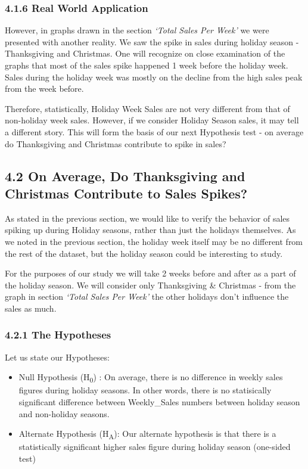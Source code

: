 \documentclass[]{article}
\begin{document}
\subsubsection{4.1.6 Real World
Application}\label{real-world-application}

However, in graphs drawn in the section \emph{`Total Sales Per Week'} we
were presented with another reality. We saw the spike in sales during
holiday season - Thanksgiving and Christmas. One will recognize on close
examination of the graphs that most of the sales spike happened 1 week
before the holiday week. Sales during the holiday week was mostly on the
decline from the high sales peak from the week before.

Therefore, statistically, Holiday Week Sales are not very different from
that of non-holiday week sales. However, if we consider Holiday Season
sales, it may tell a different story. This will form the basis of our
next Hypothesis test - on average do Thanksgiving and Christmas
contribute to spike in sales?

\pagebreak

\subsection{4.2 On Average, Do Thanksgiving and Christmas Contribute to
Sales
Spikes?}\label{on-average-do-thanksgiving-and-christmas-contribute-to-sales-spikes}

As stated in the previous section, we would like to verify the behavior
of sales spiking up during Holiday seasons, rather than just the
holidays themselves. As we noted in the previous section, the holiday
week itself may be no different from the rest of the dataset, but the
holiday season could be interesting to study.

For the purposes of our study we will take 2 weeks before and after as a
part of the holiday season. We will consider only Thanksgiving \&
Christmas - from the graph in section \emph{`Total Sales Per Week'} the
other holidays don't influence the sales as much.

\subsubsection{4.2.1 The Hypotheses}\label{the-hypotheses-1}

Let us state our Hypotheses:

\begin{itemize}
\itemsep1pt\parskip0pt
\item
  Null Hypothesis (H\textsubscript{0}) : On average, there is no
  difference in weekly sales figures during holiday seasons. In other
  words, there is no statisically significant difference between
  Weekly\_Sales numbers between holiday season and non-holiday seasons.
\item
  Alternate Hypothesis (H\textsubscript{A}): Our alternate hypothesis is
  that there is a statistically significant higher sales figure during
  holiday season (one-sided test)
\end{itemize}
\end{document}
